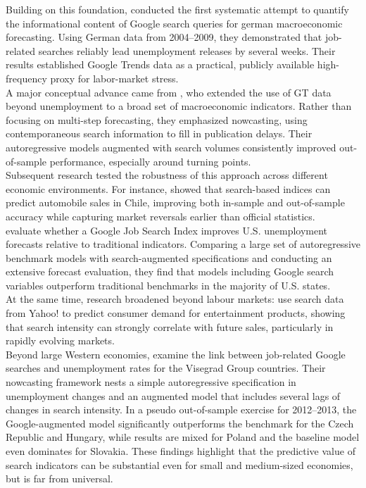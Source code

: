 \documentclass[12pt,a4paper]{article}
\begin{document}
Building on this foundation, \citet{Askitas} conducted the first systematic attempt to quantify the informational content of Google search queries for german macroeconomic forecasting. Using German data from 2004–2009, they demonstrated that job-related searches reliably lead unemployment releases by several weeks. Their results established Google Trends data as a practical, publicly available high-frequency proxy for labor-market stress.\\
A major conceptual advance came from \citet{varian}, who extended the use of GT data beyond unemployment to a broad set of macroeconomic indicators. Rather than focusing on multi-step forecasting, they emphasized nowcasting, using contemporaneous search information to fill in publication delays. Their autoregressive models augmented with search volumes consistently improved out-of-sample performance, especially around turning points.\\
Subsequent research tested the robustness of this approach across different economic environments. For instance, \citet{carrier} showed that search-based indices can predict automobile sales in Chile, improving both in-sample and out-of-sample accuracy while capturing market reversals earlier than official statistics. 
\\
 \citet{D'Amuri2010Google} evaluate whether a Google Job Search Index improves U.S. unemployment forecasts relative to traditional indicators. Comparing a large set of autoregressive benchmark models with search-augmented specifications and conducting an extensive forecast evaluation, they find that models including Google search variables outperform traditional benchmarks in the majority of U.S. states.
\\
At the same time, research broadened beyond labour markets: \citet{goel} use search data from Yahoo! to predict consumer demand for entertainment products, showing that search intensity can strongly correlate with future sales, particularly in rapidly evolving markets.\\
Beyond large Western economies, \citet{check} examine the link between job-related Google searches and unemployment rates for the Visegrad Group countries. Their nowcasting framework nests a simple autoregressive specification in unemployment changes and an augmented model that includes several lags of changes in search intensity. In a pseudo out-of-sample exercise for 2012–2013, the Google-augmented model significantly outperforms the benchmark for the Czech Republic and Hungary, while results are mixed for Poland and the baseline model even dominates for Slovakia. These findings highlight that the predictive value of search indicators can be substantial even for small and medium-sized economies, but is far from universal.
\end{document}
